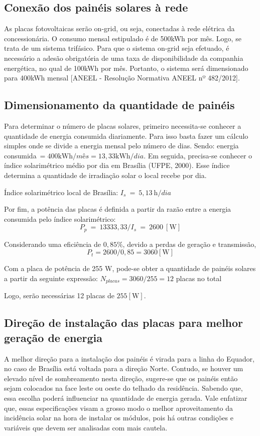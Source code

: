 \subsection{Conexão dos painéis solares à rede}
	
	As placas fotovoltaicas serão on-grid, ou seja, conectadas à rede elétrica da concessionária. O consumo mensal estipulado é de 500kWh por mês. Logo, se trata de um sistema trifásico. Para que o sistema on-grid seja efetuado, é necessário a adesão obrigatória de uma taxa de disponibilidade da companhia energética, no qual de 100kWh por mês. Portanto, o sistema será dimensionado para 400kWh mensal [ANEEL -  Resolução Normativa ANEEL nº 482/2012].

\subsection{Dimensionamento da quantidade de painéis}

	Para determinar o número de placas solares, primeiro necessita-se conhecer a quantidade de energia consumida diariamente. Para isso basta fazer um cálculo simples onde se divide a energia mensal pelo número de dias. Sendo: energia consumida$\ = 400 \si{\kilo\watt\hour}/mês = 13,33 \si{\kilo\watt\hour}/dia$. Em seguida, precisa-se conhecer o índice solarimétrico médio por dia em Brasília (UFPE, 2000). Esse índice determina a quantidade de irradiação solar o local recebe por dia.

	Índice solarimétrico local de Brasília: $I_s\ =\ 5,13\ \si{\hour}/dia$

	Por fim, a potência das placas é definida a partir da razão entre a energia consumida pelo índice solarimétrico:$$P_p\ =\ 13333,33/I_s\ =\ 2600\ [\si{\watt}]$$

	Considerando uma eficiência de $0,85\%$, devido a perdas de geração e transmissão, $$P_t = 2600/0,85 = 3060 [\si{\watt}]$$

	Com a placa de potência de 255 W, pode-se obter a quantidade de painéis solares a partir da seguinte expressão: $N_{placas} = 3060/255 = 12$ placas no total

	Logo, serão necessárias 12 placas de $255 [\si{\watt}]$.

\subsection{Direção de instalação das placas para melhor geração de energia}

	A melhor direção para a instalação dos painéis é virada para a linha do Equador, no caso de Brasília está voltada para a direção Norte. Contudo, se houver um elevado nível de sombreamento nesta direção, sugere-se que os painéis então sejam colocados na face leste ou oeste do telhado da residência. Sabendo que, essa escolha poderá influenciar na quantidade de energia gerada. Vale enfatizar que, essas especificações visam a grosso modo o melhor aproveitamento da incidência solar na hora de instalar os módulos, pois há outras condições e variáveis que devem ser analisadas com mais cautela. 

